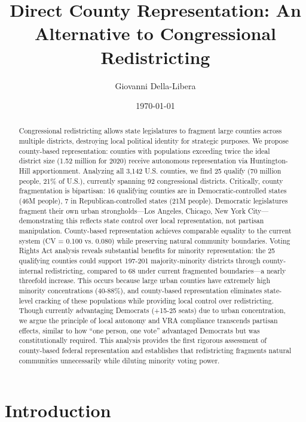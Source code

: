 \documentclass[12pt]{article}
\title{Direct County Representation: An Alternative to Congressional Redistricting}
\author{Giovanni Della-Libera}
\date{\today}
\begin{document}
\maketitle

\begin{abstract}
Congressional redistricting allows state legislatures to fragment large counties across multiple districts, destroying local political identity for strategic purposes. We propose county-based representation: counties with populations exceeding twice the ideal district size (1.52 million for 2020) receive autonomous representation via Huntington-Hill apportionment. Analyzing all 3,142 U.S. counties, we find 25 qualify (70 million people, 21\% of U.S.), currently spanning 92 congressional districts. Critically, county fragmentation is bipartisan: 16 qualifying counties are in Democratic-controlled states (46M people), 7 in Republican-controlled states (21M people). Democratic legislatures fragment their own urban strongholds---Los Angeles, Chicago, New York City---demonstrating this reflects state control over local representation, not partisan manipulation. County-based representation achieves comparable equality to the current system (CV = 0.100 vs. 0.080) while preserving natural community boundaries. Voting Rights Act analysis reveals substantial benefits for minority representation: the 25 qualifying counties could support 197-201 majority-minority districts through county-internal redistricting, compared to 68 under current fragmented boundaries---a nearly threefold increase. This occurs because large urban counties have extremely high minority concentrations (40-88\%), and county-based representation eliminates state-level cracking of these populations while providing local control over redistricting. Though currently advantaging Democrats (+15-25 seats) due to urban concentration, we argue the principle of local autonomy and VRA compliance transcends partisan effects, similar to how ``one person, one vote'' advantaged Democrats but was constitutionally required. This analysis provides the first rigorous assessment of county-based federal representation and establishes that redistricting fragments natural communities unnecessarily while diluting minority voting power.
\end{abstract}

\section{Introduction}

\end{document}
